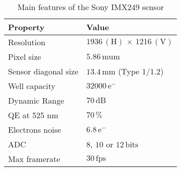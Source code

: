 \begin{table}[!h]
  \centering
  \caption{Main features of the Sony IMX249 sensor}
  \label{tab:IMX249}
  \begin{tabularx}{\linewidth}{XX}
    \toprule
    Property             & Value                                            \\
    \midrule
    Resolution           & $1936\,\mathrm{(H)}\,\times\,1216\,\mathrm{(V)}$ \\
    Pixel size           & $5.86\,\mathrm{mu m}$                            \\
    Sensor diagonal size & $13.4\,\mathrm{mm}$ (Type 1/1.2)                 \\
    Well capacity        & $32000\,\mathrm{e^{-}}$                          \\
    Dynamic Range        & $70\,\mathrm{dB}$                                \\
    QE at 525 nm         & $70\,\mathrm{\%}$                                \\
    Electrons noise      & $6.8\,\mathrm{e^{-}}$                            \\
    ADC                  & $8$, $10$ or $12\,\mathrm{bits}$                 \\
    Max framerate        & $30\,\mathrm{fps}$                               \\
    \bottomrule
  \end{tabularx}
\end{table}
